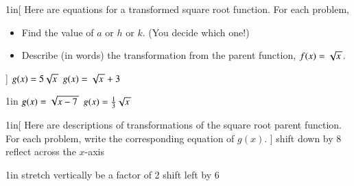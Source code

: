 \begin{my2Problems}[\normalsize]{1in}[%
    Here are equations for a transformed square root function.
    For each problem,
    \vspace{-1em}
    \begin{itemize}[nosep]
        \item Find the value of $a$ or $h$ or $k$. (You decide which one!)
        \item Describe (in words) the transformation from the parent function, $f(x)=\myRoot{x}$.
    \end{itemize}
    ]
    {
        $g(x) = 5 \myRoot{x}$
    }
    {
        $g(x) = \myRoot{x} + 3$
    }
\end{my2Problems}
\begin{my2Problems}[\normalsize]{1in}
    {
        $g(x) = \myRoot{x-7}$
    }
    {
        $g(x) = \frac{1}{3}\myRoot{x}$
    }
\end{my2Problems}



\begin{my2Problems}[\normalsize]{1in}[%
    Here are descriptions of transformations of the square root parent function.
    For each problem, write the corresponding equation of $g(x)$.
    ]
    {
        shift down by 8
    }
    {
        reflect across the $x$-axis
    }
\end{my2Problems}
\begin{my2Problems}[\normalsize]{1in}
    {
        stretch vertically be a factor of 2
    }
    {
        shift left by 6
    }
\end{my2Problems}




